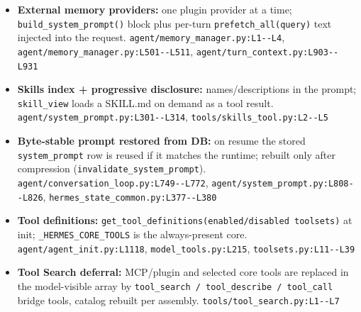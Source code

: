 \begin{itemize}
\item \textbf{External memory providers:} one plugin provider at a time; \texttt{build\_\allowbreak{}system\_\allowbreak{}prompt(\allowbreak{})} block plus per-turn \texttt{prefetch\_\allowbreak{}all(\allowbreak{}query)} text injected into the request. \texttt{agent/\allowbreak{}memory\_\allowbreak{}manager.\allowbreak{}py:\allowbreak{}L1-\allowbreak{}-\allowbreak{}L4}, \texttt{agent/\allowbreak{}memory\_\allowbreak{}manager.\allowbreak{}py:\allowbreak{}L501-\allowbreak{}-\allowbreak{}L511}, \texttt{agent/\allowbreak{}turn\_\allowbreak{}context.\allowbreak{}py:\allowbreak{}L903-\allowbreak{}-\allowbreak{}L931}
\item \textbf{Skills index + progressive disclosure:} names/descriptions in the prompt; \texttt{skill\_\allowbreak{}view} loads a SKILL.md on demand as a tool result. \texttt{agent/\allowbreak{}system\_\allowbreak{}prompt.\allowbreak{}py:\allowbreak{}L301-\allowbreak{}-\allowbreak{}L314}, \texttt{tools/\allowbreak{}skills\_\allowbreak{}tool.\allowbreak{}py:\allowbreak{}L2-\allowbreak{}-\allowbreak{}L5}
\item \textbf{Byte-stable prompt restored from DB:} on resume the stored \texttt{system\_\allowbreak{}prompt} row is reused if it matches the runtime; rebuilt only after compression (\texttt{invalidate\_\allowbreak{}system\_\allowbreak{}prompt}). \texttt{agent/\allowbreak{}conversation\_\allowbreak{}loop.\allowbreak{}py:\allowbreak{}L749-\allowbreak{}-\allowbreak{}L772}, \texttt{agent/\allowbreak{}system\_\allowbreak{}prompt.\allowbreak{}py:\allowbreak{}L808-\allowbreak{}-\allowbreak{}L826}, \texttt{hermes\_\allowbreak{}state\_\allowbreak{}common.\allowbreak{}py:\allowbreak{}L377-\allowbreak{}-\allowbreak{}L380}
\item \textbf{Tool definitions:} \texttt{get\_\allowbreak{}tool\_\allowbreak{}definitions(\allowbreak{}enabled/\allowbreak{}disabled toolsets)} at init; \texttt{\_\allowbreak{}HERMES\_\allowbreak{}CORE\_\allowbreak{}TOOLS} is the always-present core. \texttt{agent/\allowbreak{}agent\_\allowbreak{}init.\allowbreak{}py:\allowbreak{}L1118}, \texttt{model\_\allowbreak{}tools.\allowbreak{}py:\allowbreak{}L215}, \texttt{toolsets.\allowbreak{}py:\allowbreak{}L11-\allowbreak{}-\allowbreak{}L39}
\item \textbf{Tool Search deferral:} MCP/plugin and selected core tools are replaced in the model-visible array by \texttt{tool\_\allowbreak{}search /\allowbreak{} tool\_\allowbreak{}describe /\allowbreak{} tool\_\allowbreak{}call} bridge tools, catalog rebuilt per assembly. \texttt{tools/\allowbreak{}tool\_\allowbreak{}search.\allowbreak{}py:\allowbreak{}L1-\allowbreak{}-\allowbreak{}L7}

\end{itemize}
